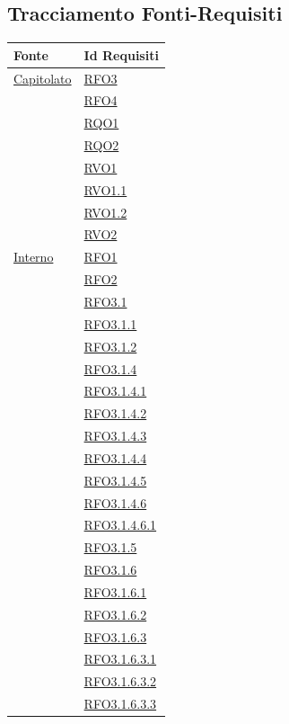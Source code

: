 \subsection{Tracciamento Fonti-Requisiti}
\normalsize
\begin{longtable}{|>{\centering}m{5cm}|m{5cm}<{\centering}|}
\hline 
\textbf{Fonte} & \textbf{Id Requisiti}\\
\hline
\endhead
\hyperlink{Capitolato}{Capitolato} & \hyperlink{RFO3}{RFO3}\\
& \hyperlink{RFO4}{RFO4}\\
& \hyperlink{RQO1}{RQO1}\\
& \hyperlink{RQO2}{RQO2}\\
& \hyperlink{RVO1}{RVO1}\\
& \hyperlink{RVO1.1}{RVO1.1}\\
& \hyperlink{RVO1.2}{RVO1.2}\\
& \hyperlink{RVO2}{RVO2}\\ \hline
\hyperlink{Interno}{Interno} & \hyperlink{RFO1}{RFO1}\\
& \hyperlink{RFO2}{RFO2}\\
& \hyperlink{RFO3.1}{RFO3.1}\\
& \hyperlink{RFO3.1.1}{RFO3.1.1}\\
& \hyperlink{RFO3.1.2}{RFO3.1.2}\\
& \hyperlink{RFO3.1.4}{RFO3.1.4}\\
& \hyperlink{RFO3.1.4.1}{RFO3.1.4.1}\\
& \hyperlink{RFO3.1.4.2}{RFO3.1.4.2}\\
& \hyperlink{RFO3.1.4.3}{RFO3.1.4.3}\\
& \hyperlink{RFO3.1.4.4}{RFO3.1.4.4}\\
& \hyperlink{RFO3.1.4.5}{RFO3.1.4.5}\\
& \hyperlink{RFO3.1.4.6}{RFO3.1.4.6}\\
& \hyperlink{RFO3.1.4.6.1}{RFO3.1.4.6.1}\\
& \hyperlink{RFO3.1.5}{RFO3.1.5}\\
& \hyperlink{RFO3.1.6}{RFO3.1.6}\\
& \hyperlink{RFO3.1.6.1}{RFO3.1.6.1}\\
& \hyperlink{RFO3.1.6.2}{RFO3.1.6.2}\\
& \hyperlink{RFO3.1.6.3}{RFO3.1.6.3}\\
& \hyperlink{RFO3.1.6.3.1}{RFO3.1.6.3.1}\\
& \hyperlink{RFO3.1.6.3.2}{RFO3.1.6.3.2}\\
& \hyperlink{RFO3.1.6.3.3}{RFO3.1.6.3.3}\\

\end{longtable}
